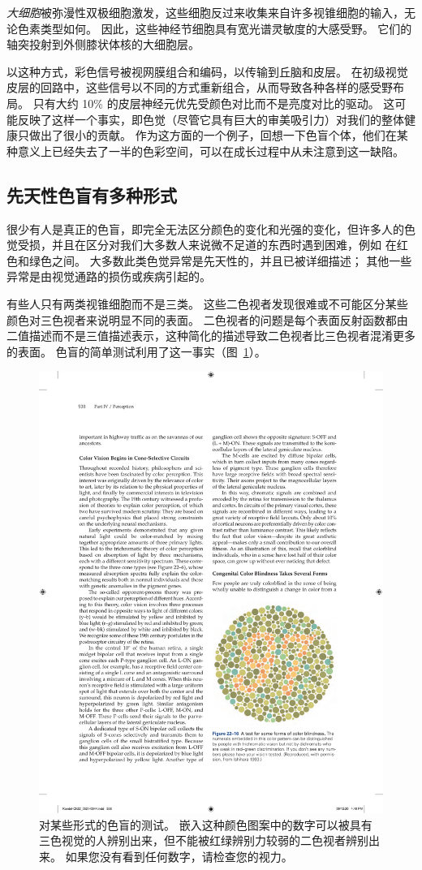 \textit{大细胞}被弥漫性双极细胞激发，这些细胞反过来收集来自许多视锥细胞的输入，无论色素类型如何。
因此，这些神经节细胞具有宽光谱灵敏度的大感受野。
它们的轴突投射到外侧膝状体核的大细胞层。


以这种方式，彩色信号被视网膜组合和编码，以传输到丘脑和皮层。
在初级视觉皮层的回路中，这些信号以不同的方式重新组合，从而导致各种各样的感受野布局。
只有大约 10\% 的皮层神经元优先受颜色对比而不是亮度对比的驱动。
这可能反映了这样一个事实，即色觉（尽管它具有巨大的审美吸引力）对我们的整体健康只做出了很小的贡献。
作为这方面的一个例子，回想一下色盲个体，他们在某种意义上已经失去了一半的色彩空间，可以在成长过程中从未注意到这一缺陷。



\subsection{先天性色盲有多种形式}

很少有人是真正的色盲，即完全无法区分颜色的变化和光强的变化，但许多人的色觉受损，并且在区分对我们大多数人来说微不足道的东西时遇到困难，例如 在红色和绿色之间。
大多数此类色觉异常是先天性的，并且已被详细描述；
其他一些异常是由视觉通路的损伤或疾病引起的。


有些人只有两类视锥细胞而不是三类。
这些二色视者发现很难或不可能区分某些颜色对三色视者来说明显不同的表面。
二色视者的问题是每个表面反射函数都由二值描述而不是三值描述表示，这种简化的描述导致二色视者比三色视者混淆更多的表面。
色盲的简单测试利用了这一事实（图~\ref{fig:22_16}）。


\begin{figure}[htbp]
	\centering
	\includegraphics[width=0.5\linewidth]{chap22/fig_22_16}
	\caption{对某些形式的色盲的测试。 
		嵌入这种颜色图案中的数字可以被具有三色视觉的人辨别出来，但不能被红绿辨别力较弱的二色视者辨别出来。 
		如果您没有看到任何数字，请检查您的视力。}
	\label{fig:22_16}
\end{figure}


